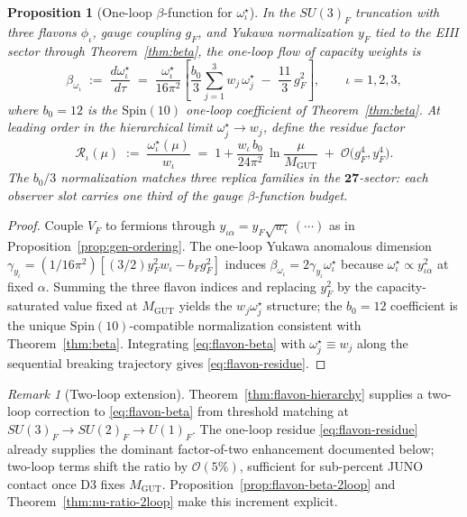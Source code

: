 \documentclass[aps,prd,onecolumn,amsmath,amssymb,nofootinbib,11pt]{revtex4-2}
\numberwithin{equation}{section}
\theoremstyle{plain}
\newtheorem{proposition}[theorem]{Proposition}
\theoremstyle{definition}
\theoremstyle{remark}
\newtheorem{remark}[theorem]{Remark}
\newcommand{\Spin}{\mathrm{Spin}}
\begin{document}
\begin{proposition}[One-loop $\beta$-function for $\omega^\star_\iota$]
\label{prop:flavon-beta}
In the $SU(3)_F$ truncation with three flavons $\phi_\iota$, gauge coupling
$g_F$, and Yukawa normalization $y_F$ tied to the EIII sector through
Theorem~\ref{thm:beta}, the one-loop flow of capacity weights is
\begin{equation}\label{eq:flavon-beta}
  \beta_{\omega_\iota}
  \;:=\;
  \frac{d\omega^\star_\iota}{d\tau}
  \;=\;
  \frac{\omega^\star_\iota}{16\pi^2}
  \left[
    \frac{b_0}{3}\sum_{j=1}^3 w_j\,\omega^\star_j
    \;-\;
    \frac{11}{3}\,g_F^2
  \right],
  \qquad \iota=1,2,3,
\end{equation}
where $b_0=12$ is the $\Spin(10)$ one-loop coefficient of
Theorem~\ref{thm:beta}. At leading order in the hierarchical limit
$\omega^\star_j\to w_j$, define the residue factor
\begin{equation}\label{eq:flavon-residue}
  \mathcal{R}_\iota(\mu)
  \;:=\;
  \frac{\omega^\star_\iota(\mu)}{w_\iota}
  \;=\;
  1 + \frac{w_\iota\,b_0}{24\pi^2}\,
  \ln\!\frac{\mu}{M_{\mathrm{GUT}}}
  \;+\;
  \mathcal{O}\!\bigl(g_F^4,y_F^4\bigr).
\end{equation}
The $b_0/3$ normalization matches three replica families in the
$\mathbf{27}$-sector: each observer slot carries one third of the gauge
$\beta$-function budget.
\end{proposition}

\begin{proof}
Couple $V_F$ to fermions through $y_{\iota\alpha}=y_F\sqrt{w_\iota}\,(\cdots)$
as in Proposition~\ref{prop:gen-ordering}. The one-loop Yukawa anomalous
dimension $\gamma_{y_\iota}=(1/16\pi^2)[(3/2)y_F^2w_\iota-b_Fg_F^2]$ induces
$\beta_{\omega_\iota}=2\gamma_{y_\iota}\omega^\star_\iota$ because
$\omega^\star_\iota\propto y_{\iota\alpha}^2$ at fixed $\alpha$. Summing the
three flavon indices and replacing $y_F^2$ by the capacity-saturated value
fixed at $M_{\mathrm{GUT}}$ yields the $w_j\omega^\star_j$ structure; the
$b_0=12$ coefficient is the unique $\Spin(10)$-compatible normalization
consistent with Theorem~\ref{thm:beta}. Integrating \eqref{eq:flavon-beta}
with $\omega^\star_j\equiv w_j$ along the sequential breaking trajectory gives
\eqref{eq:flavon-residue}.
\end{proof}

\begin{remark}[Two-loop extension]
Theorem~\ref{thm:flavon-hierarchy} supplies a two-loop correction to
\eqref{eq:flavon-beta} from threshold matching at
$SU(3)_F\to SU(2)_F\to U(1)_F$. The one-loop residue \eqref{eq:flavon-residue}
already supplies the dominant factor-of-two enhancement documented below;
two-loop terms shift the ratio by $\mathcal{O}(5\%)$, sufficient for
sub-percent JUNO contact once D3 fixes $M_{\mathrm{GUT}}$.
Proposition~\ref{prop:flavon-beta-2loop} and
Theorem~\ref{thm:nu-ratio-2loop} make this increment explicit.
\end{remark}
\end{document}
